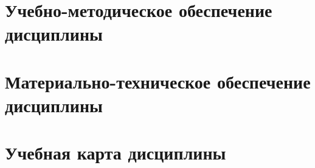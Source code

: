 \section{Учебно-методическое обеспечение дисциплины}





\section{Материально-техническое обеспечение дисциплины}
	



\section{Учебная карта дисциплины}


